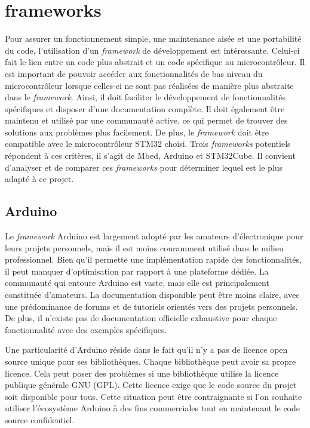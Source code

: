 \section{\gls{framework}s}

Pour assurer un fonctionnement simple, une maintenance aisée et une portabilité du code, l'utilisation d'un \textit{\gls{framework}} de développement est intéressante.
Celui-ci fait le lien entre un code plus abstrait et un code spécifique au microcontrôleur.
Il est important de pouvoir accéder aux fonctionnalités de bas niveau du microcontrôleur lorsque celles-ci ne sont pas réalisées de manière plus abstraite dans le \textit{\gls{framework}}.
Ainsi, il doit faciliter le développement de fonctionnalités spécifiques et disposer d'une documentation complète.
Il doit également être maintenu et utilisé par une communauté active, ce qui permet de trouver des solutions aux problèmes plus facilement.
De plus, le \textit{\gls{framework}} doit être compatible avec le microcontrôleur STM32 choisi.
Trois \textit{\gls{framework}s} potentiels répondent à ces critères, il s'agit de Mbed, Arduino et STM32Cube.
Il convient d'analyser et de comparer ces \textit{\gls{framework}s} pour déterminer lequel est le plus adapté à ce projet.

\subsection{Arduino}

Le \textit{\gls{framework}} Arduino est largement adopté par les amateurs d'électronique pour leurs projets personnels, mais il est moins couramment utilisé dans le milieu professionnel.
Bien qu'il permette une implémentation rapide des fonctionnalités, il peut manquer d'optimisation par rapport à une plateforme dédiée.
La communauté qui entoure Arduino est vaste, mais elle est principalement constituée d'amateurs.
La documentation disponible peut être moins claire, avec une prédominance de forums et de tutoriels orientés vers des projets personnels.
De plus, il n'existe pas de documentation officielle exhaustive pour chaque fonctionnalité avec des exemples spécifiques.

Une particularité d'Arduino réside dans le fait qu'il n'y a pas de licence open source unique pour ses bibliothèques.
Chaque bibliothèque peut avoir sa propre licence.
Cela peut poser des problèmes si une bibliothèque utilise la licence publique générale GNU (GPL).
Cette licence exige que le code source du projet soit disponible pour tous.
Cette situation peut être contraignante si l'on souhaite utiliser l'écosystème Arduino à des fins commerciales tout en maintenant le code source confidentiel.

